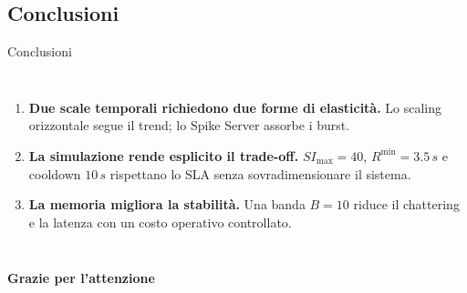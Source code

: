 \documentclass[10pt,aspectratio=169]{beamer}
\begin{document}
\subsection{Conclusioni}
\begin{frame}{Conclusioni}
  \begin{columns}[T,onlytextwidth]
    \begin{enumerate}
      \item \textbf{Due scale temporali richiedono due forme di elasticità.}
            Lo scaling orizzontale segue il trend; lo Spike Server assorbe i burst.
            \vspace{0.28cm}
      \item \textbf{La simulazione rende esplicito il trade-off.}
            \(SI_{\max}=40\), \(R^{\min}=3.5\,s\) e cooldown \(10\,s\) rispettano
            lo SLA senza sovradimensionare il sistema.
            \vspace{0.28cm}
      \item \textbf{La memoria migliora la stabilità.}
            Una banda \(B=10\) riduce il chattering e la latenza con un costo
            operativo controllato.
    \end{enumerate}
    \vspace{0.2cm}
  \end{columns}
  \vfill
  \begin{center}
    {\Large\bfseries\color{ink}Grazie per l'attenzione}
  \end{center}
\end{frame}
\end{document}
